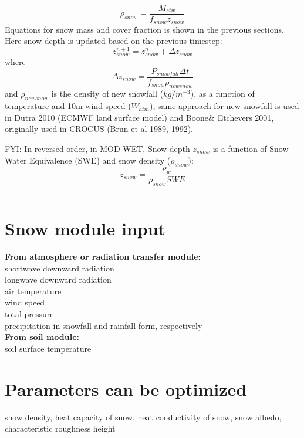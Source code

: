 \documentclass{article}
\begin{document}
\begin{equation}
\rho_{snow} = \frac{M_{stw}}{f_{snow}z_{snow}}
\end{equation}Equations for snow mass and cover fraction is shown in the previous sections. Here snow depth is updated based on the previous timestep:
\begin{equation}
z_{snow}^{n+1} = z_{snow}^{n} + \Delta z_{snow}
\end{equation}where 
\begin{equation}
\Delta z_{snow} = \frac{P_{snowfall}\Delta t}{f_{snow}\rho_{newsnow}}
\end{equation}
and $\rho_{newsnow}$ is the density of new snowfall ($kg/m^{-3}$), as a function of temperature and 10m wind speed ($W_{atm}$), same approach for new snowfall is used in Dutra 2010 (ECMWF land surface model) and Boone& Etchevers 2001, originally used in CROCUS (Brun et al 1989, 1992).

FYI: In reversed order, in MOD-WET, Snow depth $z_{snow}$ is a function of Snow Water Equivalence (SWE) and snow density ($\rho_{snow}$):
\begin{equation}
z_{snow} = \frac{\rho_w}{ \rho_{snow} SWE }
\end{equation}

\begin{equation}
\end{equation}
\section{Snow module input}
\textbf{From atmosphere or radiation transfer module:}\\
shortwave downward radiation\\
longwave downward radiation\\
air temperature \\
wind speed\\
total pressure\\
precipitation in snowfall and rainfall form, respectively\\
\textbf{From soil module:}\\
soil surface temperature

\section{Parameters can be optimized}
snow density, heat capacity of snow, heat conductivity of snow, snow albedo, characteristic roughness height 
\end{document}
